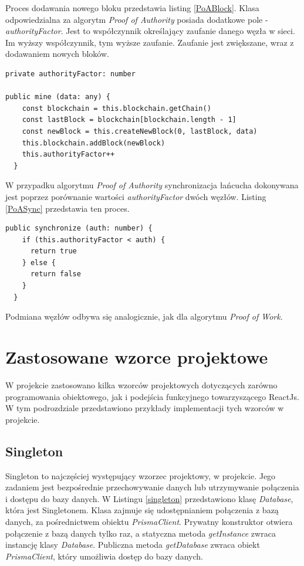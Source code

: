 \documentclass[a4paper,12pt]{book}
\begin{document}
Proces dodawania nowego bloku przedstawia listing \ref{PoABlock}. Klasa odpowiedzialna za algorytm \textit{Proof of Authority} posiada dodatkowe pole - \textit{authorityFactor}. Jest to współczynnik określający zaufanie danego węzła w sieci. Im wyższy współczynnik, tym wyższe zaufanie. Zaufanie jest zwiększane, wraz z dodawaniem nowych bloków.
 
\begin{lstlisting}[style=ES6, caption={Dodawanie nowego bloku w algorytmie Proof of Authority.}, label={PoABlock}]
private authorityFactor: number

public mine (data: any) {
    const blockchain = this.blockchain.getChain()
    const lastBlock = blockchain[blockchain.length - 1]
    const newBlock = this.createNewBlock(0, lastBlock, data)
    this.blockchain.addBlock(newBlock)
    this.authorityFactor++
  }
\end{lstlisting}

W przypadku algorytmu \textit{Proof of Authority} synchronizacja łańcucha dokonywana jest poprzez porównanie wartości \textit{authorityFactor} dwóch węzłów. Listing \ref{PoASync} przedstawia ten proces.

\begin{lstlisting}[style=ES6, caption={Synchronizacja w algorytmi Proof of Authority.}, label={PoASync}]
public synchronize (auth: number) {
    if (this.authorityFactor < auth) {
      return true
    } else {
      return false
    }
  }
\end{lstlisting}

Podmiana węzłów odbywa się analogicznie, jak dla algorytmu \textit{Proof of Work}.


\section{Zastosowane wzorce projektowe}
W projekcie zastosowano kilka wzorców projektowych dotyczących zarówno programowania obiektowego, jak i podejścia funkcyjnego towarzyszącego ReactJs. W tym podrozdziale przedstawiono przykłady implementacji tych wzorców w projekcie.

\subsection{Singleton}
Singleton to najczęściej występujący wzorzec projektowy, w projekcie. Jego zadaniem jest bezpośrednie przechowywanie danych lub utrzymywanie połączenia i dostępu do bazy danych. W Listingu \ref{singleton} przedstawiono klasę \textit{Database}, która jest Singletonem. Klasa zajmuje się udostępnianiem połączenia z bazą danych, za pośrednictwem obiektu \textit{PrismaClient}. Prywatny konstruktor otwiera połączenie z bazą danych tylko raz, a statyczna metoda \textit{getInstance} zwraca instancję klasy \textit{Database}. Publiczna metoda \textit{getDatabase} zwraca obiekt \textit{PrismaClient}, który umożliwia dostęp do bazy danych.
 
\end{document}
